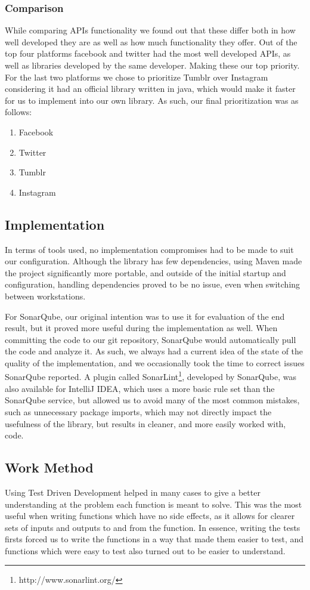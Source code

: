 \documentclass{sigchi-alternate}
\begin{document}
\subsubsection{Comparison}
While comparing APIs functionality we found out that these differ both in how well developed they are as well as how much functionality they offer. Out of the top four platforms facebook and twitter
had the most well developed APIs, as well as libraries developed by the same developer. Making these our top priority. For the last two platforms we chose to prioritize Tumblr over Instagram considering
it had an official library written in java, which would make it faster for us to implement into our own library. As such, our final prioritization was as follows:
\begin{enumerate}
	\item Facebook
	\item Twitter
	\item Tumblr
	\item Instagram
\end{enumerate}

\subsection{Implementation}
In terms of tools used, no implementation compromises had to be made to suit our configuration. Although the library has few dependencies, using Maven made the project significantly more portable, and outside of the
initial startup and configuration, handling dependencies proved to be no issue, even when switching between workstations.

For SonarQube, our original intention was to use it for evaluation of the end result, but it proved more useful during the implementation as well. When committing the code to our git repository, SonarQube would automatically
pull the code and analyze it. As such, we always had a current idea of the state of the quality of the implementation, and we occasionally took the time to correct issues SonarQube reported. A plugin called SonarLint\footnote{http://www.sonarlint.org/},
developed by SonarQube, was also available for IntelliJ IDEA, which uses a more basic rule set than the SonarQube service, but allowed us to avoid many of the most common mistakes, such as unnecessary package imports,
which may not directly impact the usefulness of the library, but results in cleaner, and more easily worked with, code.

\subsection{Work Method}
Using Test Driven Development helped in many cases to give a better understanding at the problem each function is meant to solve. This was the most useful when writing functions which have no side effects, as it allows
for clearer sets of inputs and outputs to and from the function. In essence, writing the tests firsts forced us to write the functions in a way that made them easier to test, and functions which were easy to test also
turned out to be easier to understand.
\end{document}
